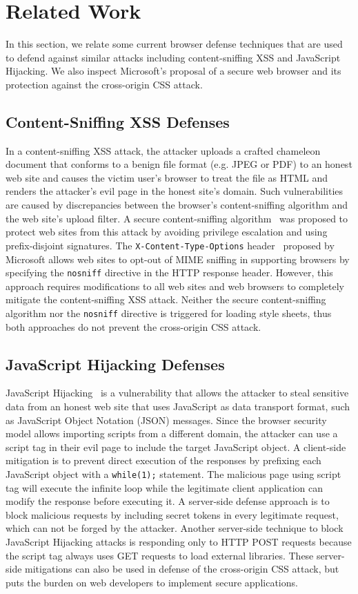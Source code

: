 \documentclass{acm_proc_article-sp}
\begin{document}
\section{Related Work}
In this section, we relate some current browser defense techniques that are used to defend against similar attacks including content-sniffing XSS and JavaScript Hijacking. We also inspect Microsoft's proposal of a secure web browser and its protection against the cross-origin CSS attack.

\subsection{Content-Sniffing XSS Defenses}
In a content-sniffing XSS attack, the attacker uploads a crafted chameleon document that conforms to a benign file format (e.g. JPEG or PDF) to an honest web site and causes the victim user's browser to treat the file as HTML and renders the attacker's evil page in the honest site's domain. Such vulnerabilities are caused by discrepancies between the browser's content-sniffing algorithm and the web site's upload filter. A secure content-sniffing algorithm~\cite{securecontentsniffing} was proposed to protect web sites from this attack by avoiding privilege escalation and using prefix-disjoint signatures. The \texttt{X-Content-Type-Options} header~\cite{nosniff} proposed by Microsoft allows web sites to opt-out of MIME sniffing in supporting browsers by specifying the \texttt{nosniff} directive in the HTTP response header. However, this approach requires modifications to all web sites and web browsers to completely mitigate the content-sniffing XSS attack. Neither the secure content-sniffing algorithm nor the \texttt{nosniff} directive is triggered for loading style sheets, thus both approaches do not prevent the cross-origin CSS attack.

\subsection{JavaScript Hijacking Defenses}
JavaScript Hijacking~\cite{jshijacking} is a vulnerability that allows the attacker to steal sensitive data from an honest web site that uses JavaScript as data transport format, such as JavaScript Object Notation (JSON) messages. Since the browser security model allows importing scripts from a different domain, the attacker can use a script tag in their evil page to include the target JavaScript object. A client-side mitigation is to prevent direct execution of the responses by prefixing each JavaScript object with a \texttt{while(1);} statement. The malicious page using script tag will execute the infinite loop while the legitimate client application can modify the response before executing it. A server-side defense approach is to block malicious requests by including secret tokens in every legitimate request, which can not be forged by the attacker. Another server-side technique to block JavaScript Hijacking attacks is responding only to HTTP POST requests because the script tag always uses GET requests to load external libraries. These server-side mitigations can also be used in defense of the cross-origin CSS attack, but puts the burden on web developers to implement secure applications.
\end{document}
